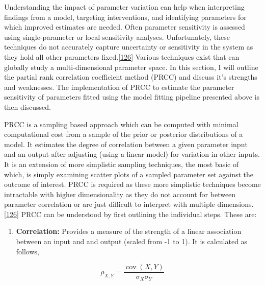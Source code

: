 \documentclass[11pt,twoside]{bristolthesis}
\providecommand{\tightlist}{%
  \setlength{\itemsep}{0pt}\setlength{\parskip}{0pt}}
\begin{document}
  Understanding the impact of parameter variation can help when interpreting findings from a model, targeting interventions, and identifying parameters for which improved estimates are needed. Often parameter sensitivity is assessed using single-parameter or local sensitivity analyses. Unfortunately, these techniques do not accurately capture uncertainty or sensitivity in the system as they hold all other parameters fixed.{[}\protect\hyperlink{ref-Marino2009a}{126}{]} Various techniques exist that can globally study a multi-dimensional parameter space. In this section, I will outline the partial rank correlation coefficient method (PRCC) and discuss it's strengths and weaknesses. The implementation of PRCC to estimate the parameter sensitivity of parameters fitted using the model fitting pipeline presented above is then discussed.
  
  PRCC is a sampling based approach which can be computed with minimal computational cost from a sample of the prior or posterior distributions of a model. It estimates the degree of correlation between a given parameter input and an output after adjusting (using a linear model) for variation in other inputs. It is an extension of more simplistic sampling techniques, the most basic of which, is simply examining scatter plots of a sampled parameter set against the outcome of interest. PRCC is required as these more simplistic techniques become intractable with higher dimensionality as they do not account for between parameter correlation or are just difficult to interpret with multiple dimensions.{[}\protect\hyperlink{ref-Marino2009a}{126}{]} PRCC can be understood by first outlining the individual steps. These are:
  \begin{enumerate}
  \def\labelenumi{\arabic{enumi}.}
  \tightlist
  \item
    \textbf{Correlation:} Provides a measure of the strength of a linear association between an input and and output (scaled from -1 to 1). It is calculated as follows,
  \end{enumerate}
  \[ 
  {\displaystyle \rho _{X,Y}={\frac {\operatorname {cov} (X,Y)}{\sigma _{X}\sigma _{Y}}}}
  \]
  
\end{document}
